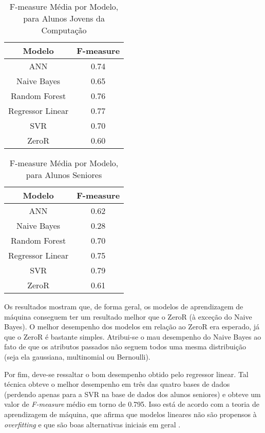 \begin{table}
\begin{center}
\begin{tabular}[c]{| c | c |}
    \hline
    \textbf{Modelo} & \textbf{F-measure} \\
    \hline
    ANN              & 0.74 \\
    \hline
    Naive Bayes      & 0.65 \\
    \hline
    Random Forest    & 0.76 \\
    \hline
    Regressor Linear & 0.77 \\
    \hline
    SVR              & 0.70 \\
    \hline
    ZeroR            & 0.60 \\
    \hline
\end{tabular}
\end{center}
\caption{F-measure Média por Modelo, para Alunos Jovens da Computação}
\label{fmeasure_comp}
\end{table}

\begin{table}
\begin{center}
\begin{tabular}[c]{| c | c |}
    \hline
    \textbf{Modelo} & \textbf{F-measure} \\
    \hline
    ANN              & 0.62 \\
    \hline
    Naive Bayes      & 0.28 \\
    \hline
    Random Forest    & 0.70 \\
    \hline
    Regressor Linear & 0.75 \\
    \hline
    SVR              & 0.79 \\
    \hline
    ZeroR            & 0.61 \\
    \hline
\end{tabular}
\end{center}
\caption{F-measure Média por Modelo, para Alunos Seniores}
\label{fmeasure_old}
\end{table}

\par Os resultados mostram que, de forma geral, os modelos de aprendizagem de máquina
conseguem ter um resultado melhor que o ZeroR (à exceção do Naive Bayes). O melhor
desempenho dos modelos em relação ao ZeroR era esperado, já que o ZeroR é bastante
simples. Atribui-se o mau desempenho do Naive Bayes ao
fato de que os atributos passados não seguem todos uma mesma distribuição (seja ela
gaussiana, multinomial ou Bernoulli). 
\par Por fim, deve-se ressaltar o bom desempenho obtido pelo regressor linear. Tal
técnica obteve o melhor desempenho em três das quatro bases de dados (perdendo apenas
para a SVR na base de dados dos alunos seniores) e obteve um valor de
\textit{F-measure} médio em torno de 0.795. Isso está de acordo com a teoria de
aprendizagem de máquina, que afirma que modelos lineares não são propensos à
\textit{overfitting} e que são boas alternativas iniciais em geral
\cite{ml_second_book}. 
